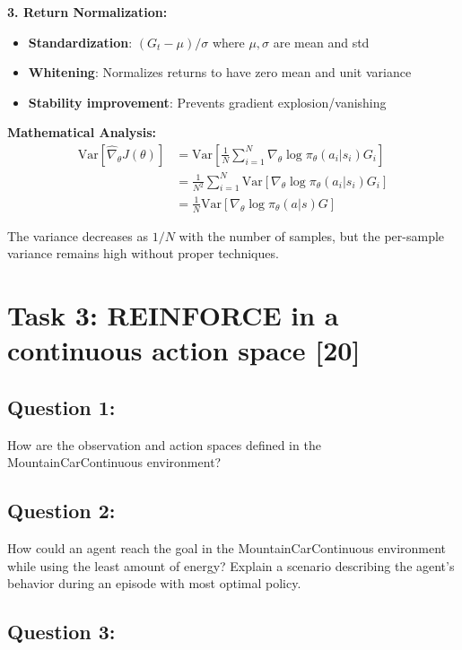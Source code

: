 \documentclass[12pt]{article}
\begin{document}
{{{\textbf{3. Return Normalization:}
\begin{itemize}
    \item \textbf{Standardization}: $(G_t - \mu)/\sigma$ where $\mu, \sigma$ are mean and std
    \item \textbf{Whitening}: Normalizes returns to have zero mean and unit variance
    \item \textbf{Stability improvement}: Prevents gradient explosion/vanishing
\end{itemize}

\textbf{Mathematical Analysis:}
\begin{align}
\text{Var}[\hat{\nabla}_\theta J(\theta)] &= \text{Var}\left[\frac{1}{N} \sum_{i=1}^{N} \nabla_\theta \log \pi_\theta(a_i|s_i) G_i\right] \\
&= \frac{1}{N^2} \sum_{i=1}^{N} \text{Var}[\nabla_\theta \log \pi_\theta(a_i|s_i) G_i] \\
&= \frac{1}{N} \text{Var}[\nabla_\theta \log \pi_\theta(a|s) G]
\end{align}

The variance decreases as $1/N$ with the number of samples, but the per-sample variance remains high without proper techniques.

\newpage

\section{Task 3: REINFORCE in a continuous action space [20]}

\subsection{Question 1:}

How are the observation and action spaces defined in the MountainCarContinuous environment?
\vspace*{0.3cm}

\subsection{Question 2:}

How could an agent reach the goal in the MountainCarContinuous environment while using the least amount of energy? Explain a scenario describing the agent's behavior during an episode with most optimal policy.
\vspace*{0.3cm}

\subsection{Question 3:}

}}}
\end{document}
